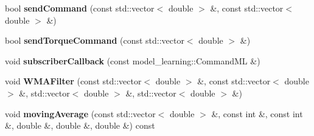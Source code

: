 \begin{DoxyCompactItemize}
\item 
bool {\bfseries send\+Command} (const std\+::vector$<$ double $>$ \&, const std\+::vector$<$ double $>$ \&)\hypertarget{classarmcontroller_a146f6d320cd7641c9fbc8c7b014a7ceb}{}\label{classarmcontroller_a146f6d320cd7641c9fbc8c7b014a7ceb}

\item 
bool {\bfseries send\+Torque\+Command} (const std\+::vector$<$ double $>$ \&)\hypertarget{classarmcontroller_adb671e988673c3750f3c846cac593eba}{}\label{classarmcontroller_adb671e988673c3750f3c846cac593eba}

\item 
void {\bfseries subscriber\+Callback} (const model\+\_\+learning\+::\+Command\+ML \&)\hypertarget{classarmcontroller_a9f48bad4ba4c88f294d1dd78df260fc7}{}\label{classarmcontroller_a9f48bad4ba4c88f294d1dd78df260fc7}

\item 
void {\bfseries W\+M\+A\+Filter} (const std\+::vector$<$ double $>$ \&, const std\+::vector$<$ double $>$ \&, std\+::vector$<$ double $>$ \&, std\+::vector$<$ double $>$ \&)\hypertarget{classarmcontroller_ac707c804ed04bcbf212c3c5456f4dffe}{}\label{classarmcontroller_ac707c804ed04bcbf212c3c5456f4dffe}

\item 
void {\bfseries moving\+Average} (const std\+::vector$<$ double $>$ \&, const int \&, const int \&, double \&, double \&, double \&) const \hypertarget{classarmcontroller_a0d755c82b60a3da6935dd9ce4968adcf}{}\label{classarmcontroller_a0d755c82b60a3da6935dd9ce4968adcf}

\end{DoxyCompactItemize}
